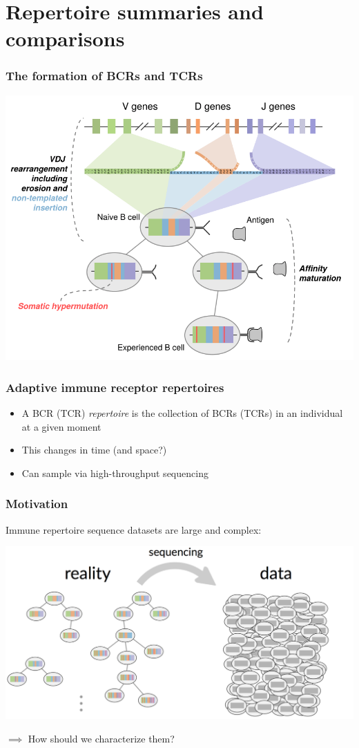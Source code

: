 \documentclass[mathserif,compress]{beamer}
\renewcommand\;{\,}
\begin{document}
\section{Repertoire summaries and comparisons}

\begin{frame}\frametitle{The formation of BCRs and TCRs}
\begin{center}
\includegraphics[width=\linewidth]{Images/BCRFormation.png}
\end{center}
\end{frame}

\begin{frame}\frametitle{Adaptive immune receptor repertoires}
\begin{itemize}
\item[]
A BCR (TCR) \emph{repertoire} is the collection of BCRs (TCRs) in an individual at a given moment
\bigskip
\item[]
This changes in time (and space?)
\bigskip
\item[]
Can sample via high-throughput sequencing
\end{itemize}
\end{frame}

\begin{frame}\frametitle{Motivation}
Immune repertoire sequence datasets are large and complex:
\begin{center}
\includegraphics[width=\linewidth]{Images/reality-data.png}
\end{center}
$\implies$ How should we characterize them?
\end{frame}
\end{document}
